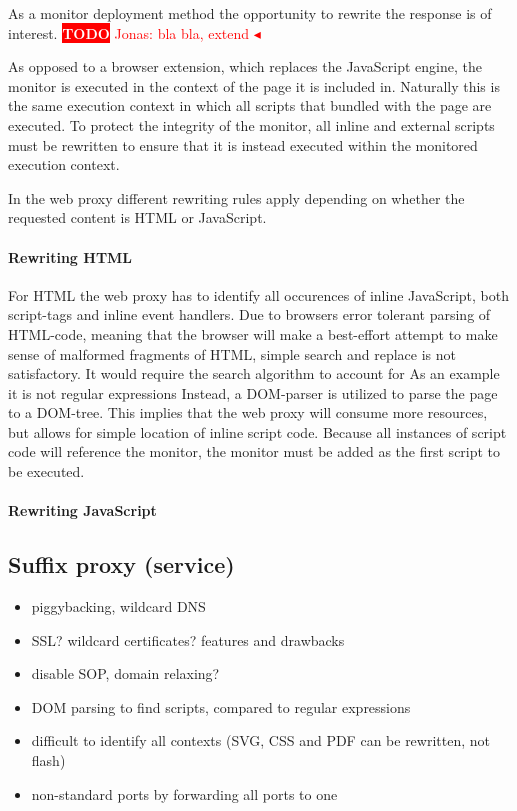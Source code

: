 \documentclass{llncs}
\newcommand{\todo}[1]{\colorbox{red}{\textcolor{white}{\sffamily\bfseries\scriptsize TODO}} \textcolor{red}{#1} \textcolor{red}{$\blacktriangleleft$}}
\begin{document}
As a monitor deployment method the opportunity to rewrite the response is 
of interest. \todo{Jonas: bla bla, extend}

As opposed to a browser extension, which replaces the JavaScript engine, the 
monitor is executed in the context of the page it is included in. Naturally 
this is the same execution context in which all scripts that bundled with the 
page are executed. To protect the integrity of the monitor, all inline and 
external scripts must be rewritten to ensure that it is instead executed within the 
monitored execution context.

In the web proxy different rewriting rules apply depending on whether the 
requested content is HTML or JavaScript. 

\paragraph{Rewriting HTML}
For HTML the web proxy has to  identify all occurences of inline JavaScript, 
both script-tags and inline event handlers.
Due to browsers error tolerant parsing of HTML-code, meaning that the browser will make a best-effort attempt to make sense of malformed fragments of HTML,
simple search and replace is not satisfactory. It would require the search algorithm to account for 
As an example it is not regular expressions 
Instead, a DOM-parser is utilized 
to parse the page to a DOM-tree. This implies that the web proxy will consume more resources, but allows for simple location of inline script code.
Because all instances of script code will reference the monitor, the monitor must be added as the first script to be executed.


\paragraph{Rewriting JavaScript}

\subsection{Suffix proxy (service)}

\begin{itemize}
\item piggybacking, wildcard DNS
\item SSL? wildcard certificates? features and drawbacks 
\item disable SOP, domain relaxing?
\item DOM parsing to find scripts, compared to regular expressions
\item difficult to identify all contexts (SVG, CSS and PDF can be rewritten, not flash)
\item non-standard ports by forwarding all ports to one
\end{itemize}
\end{document}
